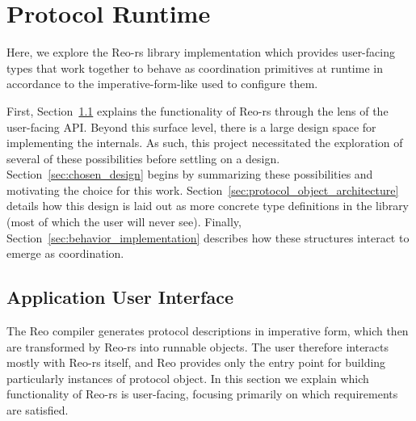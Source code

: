 \section{Protocol Runtime}
\label{sec:protocol_runtime}
Here, we explore the Reo-rs library implementation which provides user-facing types that work together to behave as coordination primitives at runtime in accordance to the imperative-form-like  used to configure them.

First, Section~\ref{sec:user_facing} explains the functionality of Reo-rs through the lens of the user-facing API. Beyond this surface level, there is a large design space for implementing the internals. As such, this project necessitated the exploration of several of these possibilities before settling on a design. Section~\ref{sec:chosen_design} begins by summarizing these possibilities and motivating the choice for this work. Section~\ref{sec:protocol_object_architecture} details how this design is laid out as more concrete type definitions in the library (most of which the user will never see). Finally, Section~\ref{sec:behavior_implementation} describes how these structures interact to emerge as coordination.

\subsection{Application User Interface}
\label{sec:user_facing}
The Reo compiler generates protocol descriptions in imperative form, which then are transformed by Reo-rs into runnable objects. The user therefore interacts mostly with Reo-rs itself, and Reo provides only the entry point for building particularly instances of protocol object. In this section we explain which functionality of Reo-rs is user-facing, focusing primarily on which requirements are satisfied.


